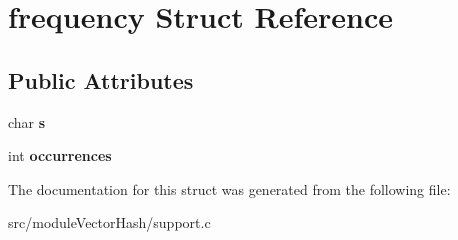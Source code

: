 \hypertarget{structfrequency}{
\section{frequency Struct Reference}
\label{structfrequency}
}
\subsection*{Public Attributes}
\begin{DoxyCompactItemize}
\item 
\hypertarget{structfrequency_a255b994c978dd69715fdb9870e553cd2}{
char {\bfseries s}}
\label{structfrequency_a255b994c978dd69715fdb9870e553cd2}

\item 
\hypertarget{structfrequency_af92c7576c0a63d227b86b08fa1ed90b5}{
int {\bfseries occurrences}}
\label{structfrequency_af92c7576c0a63d227b86b08fa1ed90b5}

\end{DoxyCompactItemize}


The documentation for this struct was generated from the following file:\begin{DoxyCompactItemize}
\item 
src/moduleVectorHash/support.c\end{DoxyCompactItemize}
